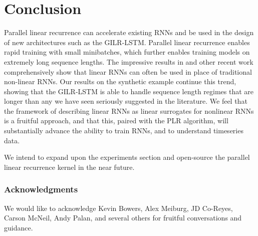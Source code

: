 \documentclass{article}
\begin{document}
\section{Conclusion}
Parallel linear recurrence can accelerate existing RNNs and be used in the design
of new architectures such as the GILR-LSTM. Parallel linear recurrence enables
rapid training with small minibatches, which further enables training models on
extremely long sequence lengths.
The impressive results in
\cite{lei2017} and other recent work comprehensively show that
linear RNNs can often be used in place of traditional non-linear RNNs.
Our results on the synthetic example continue this trend, showing that
the GILR-LSTM is able to handle sequence length regimes that are longer than any
we have seen seriously suggested in the literature. We feel that the framework
of describing linear RNNs as linear surrogates for nonlinear RNNs is a fruitful
approach, and that this, paired with the PLR algorithm, will substantially
advance the ability to train RNNs, and to understand timeseries data.



We intend to expand upon the experiments section and open-source the parallel
linear recurrence kernel in the near future.

\subsubsection*{Acknowledgments}
We would like to acknowledge Kevin Bowers, Alex Meiburg, JD Co-Reyes, Carson
McNeil, Andy Palan, and several others for fruitful conversations and guidance.
\end{document}
